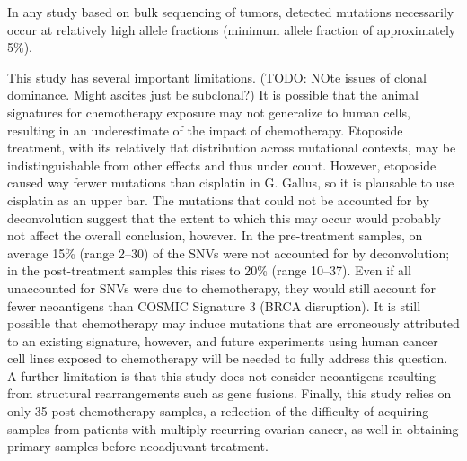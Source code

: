 In any study based on bulk sequencing of tumors, detected mutations necessarily occur at relatively high allele fractions (minimum allele fraction of approximately 5\%).

This study has several important limitations. (TODO: NOte issues of clonal dominance. Might ascites just be subclonal?) It is possible that the animal signatures for chemotherapy exposure may not generalize to human cells, resulting in an underestimate of the impact of chemotherapy. Etoposide treatment, with its relatively flat distribution across mutational contexts, may be indistinguishable from other effects and thus under count. However, etoposide caused way ferwer mutations than cisplatin in G. Gallus, so it is plausable to use cisplatin as an upper bar. The mutations that could not be accounted for by deconvolution suggest that the extent to which this may occur would probably not affect the overall conclusion, however. In the pre-treatment samples, on average 15\% (range 2--30) of the SNVs were not accounted for by deconvolution; in the post-treatment samples this rises to 20\% (range 10--37). Even if all unaccounted for SNVs were due to chemotherapy, they would still account for fewer neoantigens than COSMIC Signature 3 (BRCA disruption). It is still possible that chemotherapy may induce mutations that are erroneously attributed to an existing signature, however, and future experiments using human cancer cell lines exposed to chemotherapy will be needed to fully address this question. A further limitation is that this study does not consider neoantigens resulting from structural rearrangements such as gene fusions. Finally, this study relies on only 35 post-chemotherapy samples, a reflection of the difficulty of acquiring samples from patients with multiply recurring ovarian cancer, as well in obtaining primary samples before neoadjuvant treatment.


